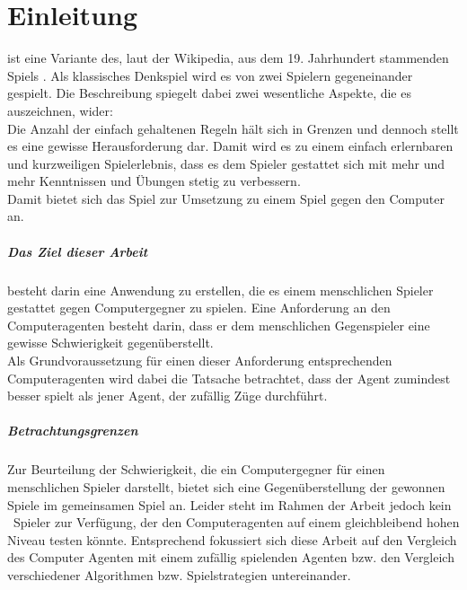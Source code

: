 \chapter{Einleitung}
\authormax

\mxZitat{\ot} ist eine Variante des, laut der Wikipedia, aus dem 19. Jahrhundert stammenden Spiels  \cite{Wiki:EN:Reversi}. Als klassisches Denkspiel wird es von zwei Spielern gegeneinander gespielt. Die Beschreibung  \cite{Rose} spiegelt dabei zwei wesentliche Aspekte, die es auszeichnen, wider:
\\Die Anzahl der einfach gehaltenen Regeln hält sich in Grenzen und dennoch stellt es eine gewisse Herausforderung dar. Damit wird es zu einem einfach erlernbaren und kurzweiligen Spielerlebnis, dass es dem Spieler gestattet sich mit mehr und mehr Kenntnissen und Übungen stetig zu verbessern.
\\Damit bietet sich das Spiel zur Umsetzung zu einem Spiel gegen den Computer an.
\paragraph{Das Ziel dieser Arbeit} besteht darin eine Anwendung zu erstellen, die es einem menschlichen Spieler gestattet gegen Computergegner \mxZitat{\ot} zu spielen. Eine Anforderung an den Computeragenten besteht darin, dass er dem menschlichen Gegenspieler eine gewisse Schwierigkeit gegenüberstellt.
\\Als Grundvoraussetzung für einen dieser Anforderung entsprechenden Computeragenten wird dabei die Tatsache betrachtet, dass der Agent zumindest besser spielt als jener Agent, der zufällig Züge durchführt.
\paragraph{Betrachtungsgrenzen}
Zur Beurteilung der Schwierigkeit, die ein Computergegner für einen menschlichen Spieler darstellt, bietet sich eine Gegenüberstellung der gewonnen Spiele im gemeinsamen Spiel an. Leider steht im Rahmen der Arbeit jedoch kein \ot\ Spieler zur Verfügung, der den Computeragenten auf einem gleichbleibend hohen Niveau testen könnte. Entsprechend fokussiert sich diese Arbeit auf den Vergleich des Computer Agenten mit einem zufällig spielenden Agenten bzw. den Vergleich verschiedener Algorithmen bzw. Spielstrategien untereinander.
\newpage
